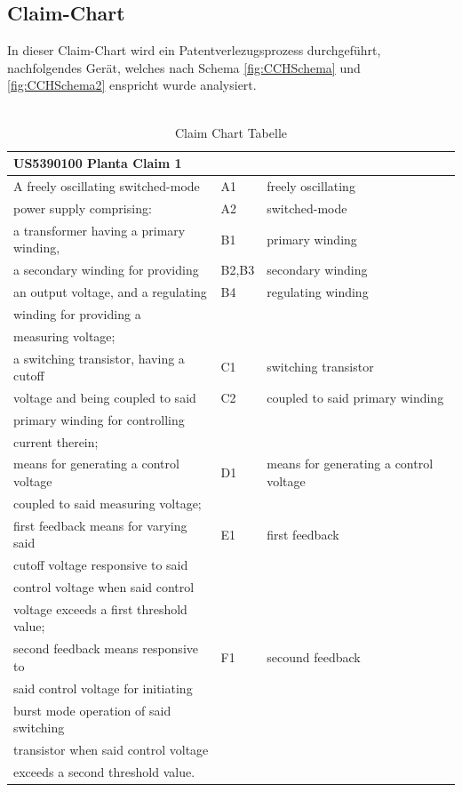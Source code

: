 \subsection{Claim-Chart}\label{sec:Claim-Chart}
In dieser Claim-Chart wird ein Patentverlezugsprozess durchgeführt, nachfolgendes Gerät, welches nach Schema \ref{fig:CCHSchema} und \ref{fig:CCHSchema2} enspricht wurde analysiert.\\
\\

\begin{table}[htbp]
\begin{tabular}{|l|l|l|}
	\hline 
\textbf{US5390100 Planta Claim 1}& &    \\ 
	\hline 
 A freely oscillating switched-mode &A1 & freely oscillating\\
 power supply comprising:	& A2 &switched-mode  \\ 
	\hline 
a transformer having a primary winding,& B1 &primary winding\\
a secondary winding for providing &B2,B3 &secondary winding\\ 
an output voltage, and a regulating& B4&regulating winding\\
winding for providing a& & \\
measuring voltage; & &	 \\
	\hline 
a switching transistor, having a cutoff& C1 & switching transistor \\
voltage and being coupled to said  &C2  &coupled to said primary winding \\
primary winding for controlling & & \\
current therein;	&  &  \\ 
	\hline 
means for generating a control voltage& D1 & means for generating a control voltage\\
coupled to said measuring voltage;	&  & \\ 
	\hline 
first feedback means for varying said & E1 &first feedback\\
cutoff voltage responsive to said  &  &\\
control voltage when said control & &\\
voltage exceeds a first threshold value;  & &\\ 
	\hline 
second feedback means responsive to& F1&secound feedback\\
said control voltage for initiating  &  &\\
burst mode operation of said switching& & \\
transistor when said control voltage & &\\
exceeds a second threshold value.	&  &  \\ 
	\hline 
\end{tabular}
\caption{Claim Chart Tabelle}
\label{tab:Claim} 
\end{table}





